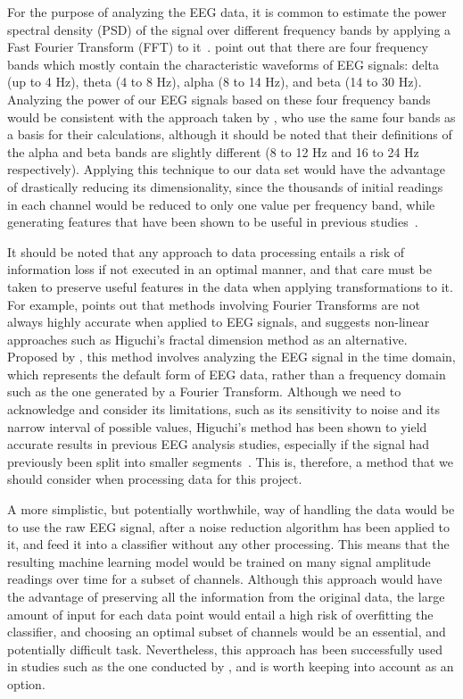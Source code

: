 \documentclass{mprop}
\begin{document}
For the purpose of analyzing the EEG data, it is common to estimate the power spectral density (PSD) of the signal over different frequency bands by applying a Fast Fourier Transform (FFT) to it~\cite{al-fahoum_methods_2014}. \citet{subasi_neural_2005} point out that there are four frequency bands which mostly contain the characteristic waveforms of EEG signals: delta (up to 4 Hz), theta (4 to 8 Hz), alpha (8 to 14  Hz), and beta (14 to 30  Hz). Analyzing the power of our EEG signals based on these four frequency bands would be consistent with the approach taken by \citet{vuckovic_dynamic_2014}, who use the same four bands as a basis for their calculations, although it should be noted that their definitions of the alpha and beta bands are slightly different (8 to 12 Hz and 16 to 24 Hz respectively). Applying this technique to our data set would have the advantage of drastically reducing its dimensionality, since the thousands of initial readings in each channel would be reduced to only one value per frequency band, while generating features that have been shown to be useful in previous studies~\cite{jarjees_causality_2017,vuckovic_dynamic_2014,vuckovic_prediction_2018}.

It should be noted that any approach to data processing entails a risk of information loss if not executed in an optimal manner, and that care must be taken to preserve useful features in the data when applying transformations to it. For example, \citet{klonowski_everything_2009} points out that methods involving Fourier Transforms are not always highly accurate when applied to EEG signals, and suggests non-linear approaches such as Higuchi's fractal dimension method as an alternative. Proposed by \citet{higuchi_approach_1988}, this method involves analyzing the EEG signal in the time domain, which represents the default form of EEG data, rather than a frequency domain such as the one generated by a Fourier Transform. Although we need to acknowledge and consider its limitations, such as its sensitivity to noise and its narrow interval of possible values, Higuchi's method has been shown to yield accurate results in previous EEG analysis studies, especially if the signal had previously been split into smaller segments~\cite{kesic_application_2016}. This is, therefore, a method that we should consider when processing data for this project.

A more simplistic, but potentially worthwhile, way of handling the data would be to use the raw EEG signal, after a noise reduction algorithm has been applied to it, and feed it into a classifier without any other processing. This means that the resulting machine learning model would be trained on many signal amplitude readings over time for a subset of channels. Although this approach would have the advantage of preserving all the information from the original data, the large amount of input for each data point would entail a high risk of overfitting the classifier, and choosing an optimal subset of channels would be an essential, and potentially difficult task. Nevertheless, this approach has been successfully used in studies such as the one conducted by \citet{kaper_bci_2004}, and is worth keeping into account as an option.
\end{document}
